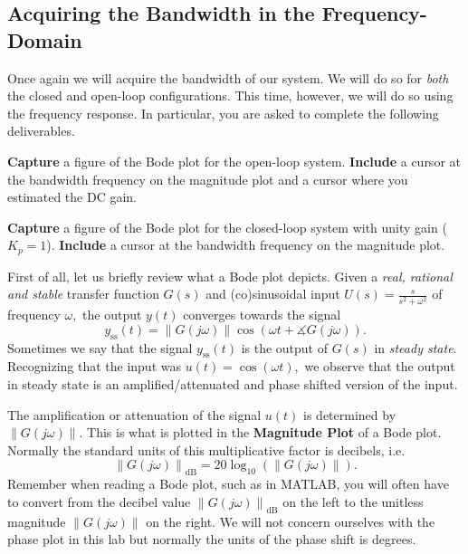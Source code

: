 \subsection{Acquiring the Bandwidth in the Frequency-Domain}
Once again we will acquire the bandwidth of our system. We will do so for
\emph{both} the closed and open-loop configurations. This time, however,
we will do so using the frequency response. In particular, you are asked
to complete the following deliverables.
%
\begin{deliverable}[label={lab2:d3a}]
  \textbf{Capture} a figure of the Bode plot for the 
  open-loop system.
  \textbf{Include} a cursor at the bandwidth frequency on the magnitude
  plot and a cursor where you estimated the DC gain.
\end{deliverable}
%
\begin{deliverable}[label={lab2:d3}]
  \textbf{Capture} a figure of the Bode plot for the closed-loop system
  with unity gain (\(K_p = 1\)).
  \textbf{Include} a cursor at the bandwidth frequency on the magnitude
  plot.
\end{deliverable}
%
First of all, let us briefly review what a Bode plot depicts.
Given a \emph{real, rational and stable} transfer function \(G(s)\) and
(co)sinusoidal input
\(U(s) = \frac{s}{s^2 +\omega^2}\) of frequency \(\omega,\) the
output \(y(t)\) converges towards the signal
\[
  y_\mathrm{ss}(t)
    = \left\| G(j\omega) \right\| \cos(\omega t + \measuredangle G(j\omega)).
\]
Sometimes we say that the signal \(y_\mathrm{ss}(t)\) is the output of
\(G(s)\) in \emph{steady state}.
Recognizing that the input was \(u(t) = \cos(\omega t),\) we observe that the
output in steady state is an amplified/attenuated and phase shifted
version of the input.

The amplification or attenuation of the signal \(u(t)\) is determined by
\(\left\|G(j\omega)\right\|.\) This is what is plotted in the \textbf{
Magnitude Plot} of a Bode plot. Normally the standard units of this
multiplicative factor is decibels, i.e.
\[
\left\|G(j\omega)\right\|_{\mathrm{dB}} = 20 \log_{10}\left( \left\|G(j\omega)\right\| \right).
\]
Remember when reading a Bode plot, such as in MATLAB, you will often have to
convert from the decibel value \(\left\|G(j\omega)\right\|_{\mathrm{dB}}\) on
the left to the unitless magnitude \(\left\|G(j\omega)\right\|\) on the right.
We will not concern ourselves with the phase plot in this lab but normally
the units of the phase shift is degrees.

